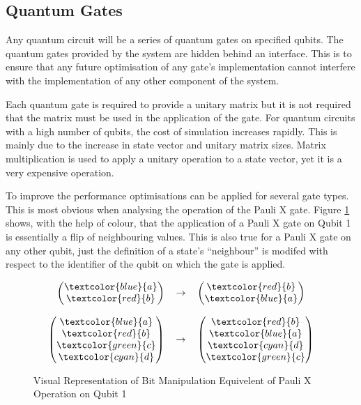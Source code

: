 \subsection{Quantum Gates}
\label{sec:quantumgates}
Any quantum circuit will be a series of quantum gates on specified qubits.
The quantum gates provided by the system are hidden behind an interface.
This is to ensure that any future optimisation of any gate's implementation cannot interfere with the implementation of any other component of the system.

Each quantum gate is required to provide a unitary matrix but it is not required that the matrix must be used in the application of the gate.
For quantum circuits with a high number of qubits, the cost of simulation increases rapidly.
This is mainly due to the increase in state vector and unitary matrix sizes.
Matrix multiplication is used to apply a unitary operation to a state vector, yet it is a very expensive operation.

To improve the performance optimisations can be applied for several gate types.
This is most obvious when analysing the operation of the Pauli X gate.
Figure \ref{eq:paulixcheaptrickvisual} shows, with the help of colour, that the application of a Pauli X gate on Qubit 1 is essentially a flip of neighbouring values.
This is also true for a Pauli X gate on any other qubit, just the definition of a state's ``neighbour'' is modifed with respect to the identifier of the qubit on which the gate is applied.

\begin{figure}
\[
\begin{tabular}{ r c l }
  \(\begin {pmatrix}
    \textcolor{blue}{a}\\
    \textcolor{red}{b}
  \end{pmatrix}\) 
& 
  \(\rightarrow\) 
& 
  \(\begin {pmatrix}
    \textcolor{red}{b}\\
    \textcolor{blue}{a}
  \end{pmatrix}\) \\

\\

  \(\begin {pmatrix}
    \textcolor{blue}{a}\\
    \textcolor{red}{b}\\
    \textcolor{green}{c}\\
    \textcolor{cyan}{d}
  \end{pmatrix}\)
  & \(\rightarrow\)
  & \(\begin {pmatrix}
    \textcolor{red}{b}\\
    \textcolor{blue}{a}\\
    \textcolor{cyan}{d}\\
    \textcolor{green}{c}
  \end{pmatrix}\) \\
\end{tabular}
\]
\label{eq:paulixcheaptrickvisual}
\caption{Visual Representation of Bit Manipulation Equivelent of Pauli X Operation on Qubit 1}
\end{figure}

